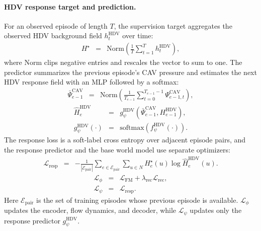 \paragraph{HDV response target and prediction.}  For an observed episode of
length \(T\), the supervision target aggregates the observed HDV background
field \(h^{\mathrm{HDV}}_t\) over time:
\begin{equation}
\begin{array}{rcl}
H^\star
&=&
\mathrm{Norm}\!\left(
\displaystyle\frac{1}{T}\sum_{t=1}^{T} h^{\mathrm{HDV}}_t
\right),
\end{array}
\end{equation}
where \(\mathrm{Norm}\) clips negative entries and rescales the vector to
sum to one.  The predictor summarizes the previous episode's CAV pressure and
estimates the next HDV response field with an MLP followed by a softmax:
\begin{equation}
\begin{array}{rcl}
\bar\Psi_{e-1}^{\mathrm{CAV}}
&=&
\mathrm{Norm}\!\left(
\displaystyle\frac{1}{T_{e-1}}
\sum_{t=0}^{T_{e-1}-1}\Psi_{e-1,t}^{\mathrm{CAV}}
\right),
\end{array}
\end{equation}
\begin{equation}
\begin{array}{rcl}
\hat H_e^{\mathrm{HDV}}
&=&
g_\psi^{\mathrm{HDV}}
\!\left(
\bar\Psi_{e-1}^{\mathrm{CAV}},
H_{e-1}^{\mathrm{HDV}}
\right),\\[0.35em]
g_\psi^{\mathrm{HDV}}(\cdot)
&=&
\mathrm{softmax}\!\left(f_\psi^{\mathrm{HDV}}(\cdot)\right).
\end{array}
\end{equation}
The response loss is a soft-label cross entropy over adjacent episode pairs,
and the response predictor and the base world model use separate optimizers:
\begin{equation}
\begin{array}{rcl}
\mathcal{L}_{\mathrm{resp}}
&=&
\displaystyle
-
\frac{1}{|\mathcal{E}_{\mathrm{pair}}|}
\sum_{e\in\mathcal{E}_{\mathrm{pair}}}
\sum_{u\in N}
H_e^\star(u)
\log \hat H_e^{\mathrm{HDV}}(u).
\end{array}
\end{equation}
\begin{equation}
\begin{array}{rcl}
\mathcal{L}_{\phi}
&=&
\mathcal{L}_{\mathrm{FM}}
+
\lambda_{\mathrm{rec}}\mathcal{L}_{\mathrm{rec}},\\[0.35em]
\mathcal{L}_{\psi}
&=&
\mathcal{L}_{\mathrm{resp}}.
\end{array}
\end{equation}
Here \(\mathcal{E}_{\mathrm{pair}}\) is the set of training episodes whose
previous episode is available.  \(\mathcal{L}_{\phi}\) updates the encoder,
flow dynamics, and decoder, while \(\mathcal{L}_{\psi}\) updates only the
response predictor \(g_\psi^{\mathrm{HDV}}\).

